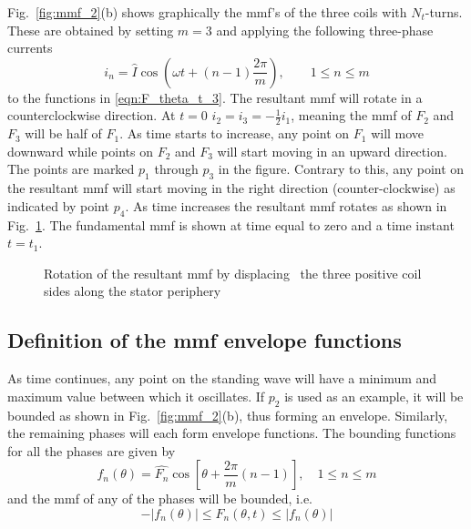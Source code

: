 Fig.~\ref{fig:mmf_2}(b) shows graphically the mmf's of the three coils with $N_t$-turns. These are obtained by setting $m=3$ and applying the following three-phase currents 
\begin{equation}
  \label{eqn:3ph_i}
   i_n = \hat{I}\cos\left(\omega t +(n-1)\frac{2\pi}{m}\right),
  \qquad
  1 \leq n \leq m
\end{equation}
to the functions in \eqref{eqn:F_theta_t_3}. The resultant mmf will rotate in a counterclockwise direction. At $t=0$ $i_2=i_3=-\frac{1}{2}i_1$, meaning the mmf of $F_2$ and $F_3$ will be half of $F_1$. As time starts to increase, any point on $F_1$ will move downward while points on $F_2$ and $F_3$ will start moving in an upward direction. The points are marked $p_1$ through $p_3$ in the figure. Contrary to this, any point on the resultant mmf will start moving in the right direction (counter-clockwise) as indicated by point $p_4$. As time increases the resultant mmf rotates as shown in Fig.~\ref{fig:rotating_wave}. The fundamental mmf is shown at time equal to zero and a time instant $t=t_1$.
\begin{figure}
  \centering
  	
  \caption[Rotation of the resultant mmf]{Rotation of the resultant mmf by displacing~%
  the three positive coil sides along the stator periphery}
  \label{fig:rotating_wave}
\end{figure}

\subsection{Definition of the mmf envelope functions}\label{subsec:mmf_def}
As time continues, any point on the standing wave will have a minimum and maximum value between which it oscillates. If $p_2$ is used as an example, it will be bounded as shown in Fig.~\ref{fig:mmf_2}(b), thus forming an envelope. Similarly, the remaining phases will each form envelope functions. The bounding functions for all the phases are given by
\begin{equation}
  \label{eqn:f_bound}
  f_n(\theta) = \hat{F_n}\cos\left[\theta+\frac{2\pi}{m}(n-1) \right], 
  \quad 1 \leq n \leq m
\end{equation}
and the mmf of any of the phases will be bounded, i.e. 
\begin{equation}
  -\left|f_n(\theta)\right| \leq F_n(\theta ,t) \leq \left|f_n(\theta)\right|
\end{equation}

